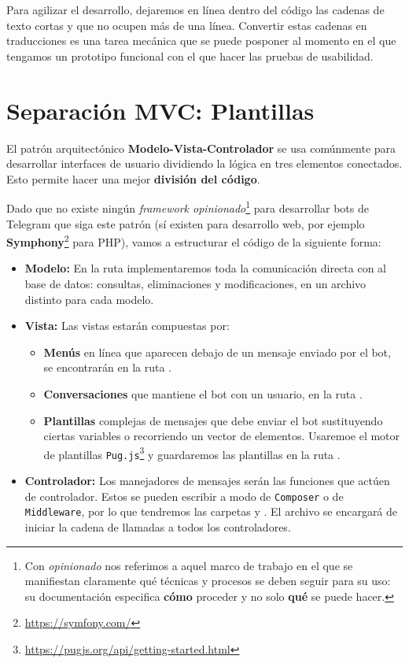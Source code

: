 Para agilizar el desarrollo, dejaremos en línea dentro del código las cadenas de texto cortas y que no ocupen más de una línea. Convertir estas cadenas en traducciones es una tarea mecánica que se puede posponer al momento en el que tengamos un prototipo funcional con el que hacer las pruebas de usabilidad.

\section{Separación MVC: Plantillas}

El patrón arquitectónico \textbf{Modelo-Vista-Controlador} se usa comúnmente para desarrollar interfaces de usuario dividiendo la lógica en tres elementos conectados\cite{whatIsMVC}. Esto permite hacer una mejor \textbf{división del código}.

Dado que no existe ningún \textit{framework opinionado}\footnote{Con \textit{opinionado} nos referimos a aquel marco de trabajo en el que se manifiestan claramente qué técnicas y procesos se deben seguir para su uso: su documentación especifica \textbf{cómo} proceder y no solo \textbf{qué} se puede hacer.} para desarrollar bots de Telegram que siga este patrón (sí existen para desarrollo web, por ejemplo \textbf{Symphony}\footnote{\url{https://symfony.com/}} para PHP), vamos a estructurar el código de la siguiente forma:

\begin{itemize}
    \item \textbf{Modelo:} En la ruta  implementaremos toda la comunicación directa con al base de datos: consultas, eliminaciones y modificaciones, en un archivo distinto para cada modelo.
    \item \textbf{Vista:} Las vistas estarán compuestas por:
    \begin{itemize}
        \item \textbf{Menús} en línea que aparecen debajo de un mensaje enviado por el bot, se encontrarán en la ruta .
        \item \textbf{Conversaciones} que mantiene el bot con un usuario, en la ruta .
        \item \textbf{Plantillas} complejas de mensajes que debe enviar el bot sustituyendo ciertas variables o recorriendo un vector de elementos. Usaremoe el motor de plantillas \texttt{Pug.js}\footnote{\url{https://pugjs.org/api/getting-started.html}} y guardaremos las plantillas en la ruta .
    \end{itemize}
    \item \textbf{Controlador:} Los manejadores de mensajes serán las funciones que actúen de controlador. Estos se pueden escribir a modo de \texttt{Composer} o de \texttt{Middleware}, por lo que tendremos las carpetas  y . El archivo  se encargará de iniciar la cadena de llamadas a todos los controladores.
\end{itemize}

